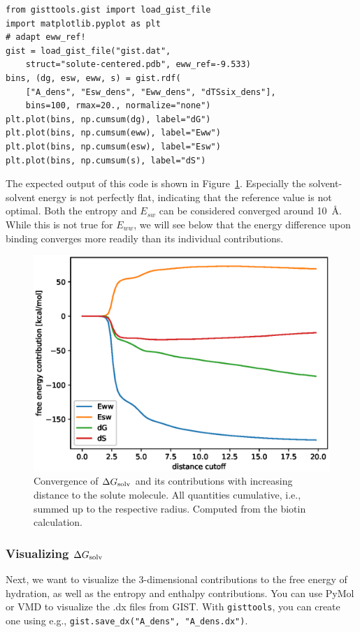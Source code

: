 \documentclass[9pt,tutorial]{livecoms}
\newcommand{\dgsolv}{\Delta G_\textup{solv}}
\newcommand{\software}{\texttt}
\newcommand\inlinecode{\texttt}
\begin{document}
\begin{lstlisting}[style=python]
from gisttools.gist import load_gist_file
import matplotlib.pyplot as plt
# adapt eww_ref!
gist = load_gist_file("gist.dat",
    struct="solute-centered.pdb", eww_ref=-9.533)
bins, (dg, esw, eww, s) = gist.rdf(
    ["A_dens", "Esw_dens", "Eww_dens", "dTSsix_dens"],
    bins=100, rmax=20., normalize="none")
plt.plot(bins, np.cumsum(dg), label="dG")
plt.plot(bins, np.cumsum(eww), label="Eww")
plt.plot(bins, np.cumsum(esw), label="Esw")
plt.plot(bins, np.cumsum(s), label="dS")
\end{lstlisting}

The expected output of this code is shown in Figure~\ref{fig_radial_convergence}.
Especially the solvent-solvent energy is not perfectly flat, indicating that the reference value is not optimal.
Both the entropy and $E_{sw}$ can be considered converged around \SI{10}{\angstrom}.
While this is not true for $E_{ww}$, we will see below that the energy difference upon binding converges more readily than its individual contributions.

\begin{figure}
	\centering
	\includegraphics[width=0.8\linewidth]{figures/A_E_S_convergence.eps}
	\caption{Convergence of $\dgsolv$ and its contributions with increasing distance to the solute molecule. All quantities cumulative, i.e., summed up to the respective radius. Computed from the biotin calculation.}\label{fig_radial_convergence}
\end{figure}

\subsubsection{Visualizing $\dgsolv$}
Next, we want to visualize the 3-dimensional contributions to the free energy of hydration, as well as the entropy and enthalpy contributions.
You can use PyMol\cite{pymol} or VMD\cite{vmd} to visualize the .dx files from GIST\@.
With \software{gisttools}, you can create one using e.g., \inlinecode{gist.save\_dx("A\_dens", "A\_dens.dx")}.
\end{document}
